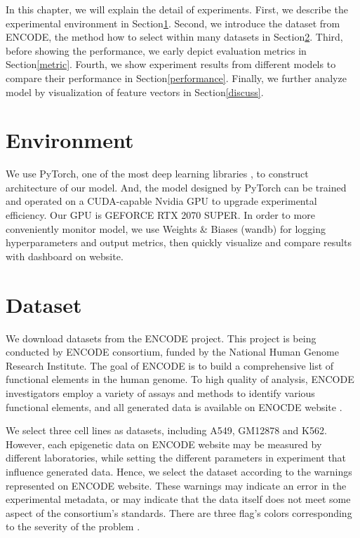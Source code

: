 \hspace{24pt}
\renewcommand{\baselinestretch}{1.5}

In this chapter, we will explain the detail of experiments. First, we describe the experimental environment in Section\ref{environment}. Second, we introduce the dataset from ENCODE, the method how to select within many datasets in Section\ref{dataset}. Third, before showing the performance, we early depict evaluation metrics in Section\ref{metric}. Fourth, we show experiment results from different models to compare their performance in Section\ref{performance}. Finally, we further analyze model by visualization of feature vectors in Section\ref{discuss}.

\section{Environment} \label{environment}
We use PyTorch, one of the most deep learning libraries \cite{paszke2017automatic}, to construct architecture of our model. And, the model designed by PyTorch can be trained and operated on a CUDA-capable Nvidia GPU to upgrade experimental efficiency. Our GPU is GEFORCE RTX 2070 SUPER. In order to more conveniently monitor model, we use Weights \& Biases (wandb) \cite{wandb} for logging hyperparameters and output metrics, then quickly visualize and compare results with dashboard on website.

\section{Dataset} \label{dataset}
We download datasets from the ENCODE project. This project is being conducted by ENCODE consortium, funded by the National Human Genome Research Institute. The goal of ENCODE is to build a comprehensive list of functional elements in the human genome. To high quality of analysis, ENCODE investigators employ a variety of assays and methods to identify various functional elements, and all generated data is available on ENOCDE website \cite{davis2018encyclopedia}.

We select three cell lines as datasets, including A549, GM12878 and K562. However, each epigenetic data on ENCODE website may be measured by different laboratories, while setting the different parameters in experiment that influence generated data. Hence, we select the dataset according to the warnings represented on ENCODE website. These warnings may indicate an error in the experimental metadata, or may indicate that the data itself does not meet some aspect of the consortium’s standards. There are three flag’s colors corresponding to the severity of the problem \cite{davis2018encyclopedia}.

